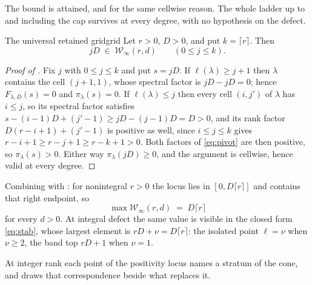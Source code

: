 \documentclass[11pt,letterpaper]{article}
\begin{document}
The bound is attained, and for the same cellwise reason. The whole ladder up to
and including the cap survives at every degree, with no hypothesis on the defect.

\begin{proposition}{The universal retained grid}{grid}
Let $r>0$, $D>0$, and put $k=\lceil r\rceil$. Then
\begin{equation}
  jD\;\in\;\mathcal{W}_\infty(r,d)\qquad(0\le j\le k).
  \label{eq:grid}
\end{equation}
\end{proposition}

\begin{proof}[Proof of ]
Fix $j$ with $0\le j\le k$ and put $s=jD$. If $\ell(\lambda)\ge j+1$ then
$\lambda$ contains the cell $(j+1,1)$, whose spectral factor is $jD-jD=0$; hence
$F_{\lambda,D}(s)=0$ and $\pi_\lambda(s)=0$. If $\ell(\lambda)\le j$ then every
cell $(i,j')$ of $\lambda$ has $i\le j$, so its spectral factor satisfies
$s-(i-1)D+(j'-1)\ge jD-(j-1)D=D>0$, and its rank factor $D(r-i+1)+(j'-1)$ is
positive as well, since $i\le j\le k$ gives $r-i+1\ge r-j+1\ge r-k+1>0$. Both
factors of \eqref{eq:pivot} are then positive, so $\pi_\lambda(s)>0$. Either way
$\pi_\lambda(jD)\ge0$, and the argument is cellwise, hence valid at every degree.
\end{proof}

Combining  with : for nonintegral $r>0$ the locus
lies in $[0,D\lceil r\rceil]$ and contains that right endpoint, so
\begin{equation}
  \max\mathcal{W}_\infty(r,d)\;=\;D\lceil r\rceil
  \label{eq:maxlocus}
\end{equation}
for every $d>0$. At integral defect the same value is visible in the closed form
\eqref{eq:stab}, whose largest element is $rD+\nu=D\lceil r\rceil$: the isolated
point $\ell=\nu$ when $\nu\ge2$, the band top $rD+1$ when $\nu=1$.

At integer rank each point of the positivity locus names a stratum of the cone,
and  draws that correspondence beside what replaces it.
\end{document}
